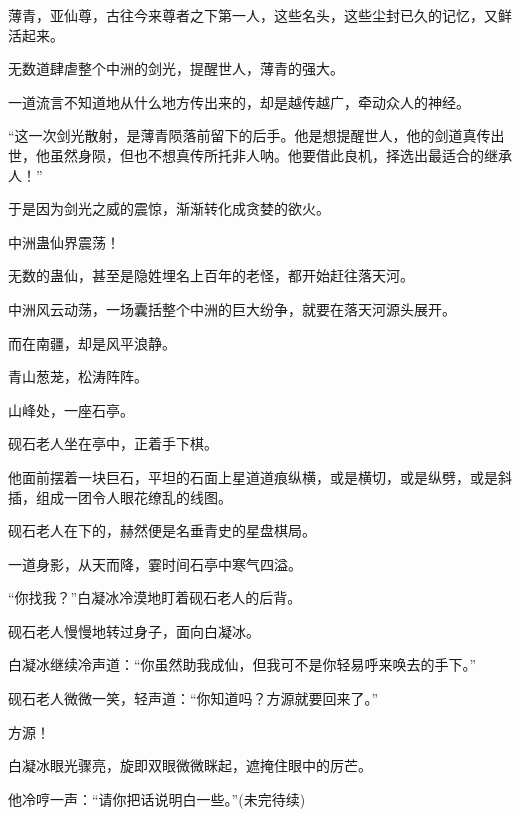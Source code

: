 \begin{this_body}
薄青，亚仙尊，古往今来尊者之下第一人，这些名头，这些尘封已久的记忆，又鲜活起来。

无数道肆虐整个中洲的剑光，提醒世人，薄青的强大。

一道流言不知道地从什么地方传出来的，却是越传越广，牵动众人的神经。

“这一次剑光散射，是薄青陨落前留下的后手。他是想提醒世人，他的剑道真传出世，他虽然身陨，但也不想真传所托非人呐。他要借此良机，择选出最适合的继承人！”

于是因为剑光之威的震惊，渐渐转化成贪婪的欲火。

中洲蛊仙界震荡！

无数的蛊仙，甚至是隐姓埋名上百年的老怪，都开始赶往落天河。

中洲风云动荡，一场囊括整个中洲的巨大纷争，就要在落天河源头展开。

而在南疆，却是风平浪静。

青山葱茏，松涛阵阵。

山峰处，一座石亭。

砚石老人坐在亭中，正着手下棋。

他面前摆着一块巨石，平坦的石面上星道道痕纵横，或是横切，或是纵劈，或是斜插，组成一团令人眼花缭乱的线图。

砚石老人在下的，赫然便是名垂青史的星盘棋局。

一道身影，从天而降，霎时间石亭中寒气四溢。

“你找我？”白凝冰冷漠地盯着砚石老人的后背。

砚石老人慢慢地转过身子，面向白凝冰。

白凝冰继续冷声道：“你虽然助我成仙，但我可不是你轻易呼来唤去的手下。”

砚石老人微微一笑，轻声道：“你知道吗？方源就要回来了。”

方源！

白凝冰眼光骤亮，旋即双眼微微眯起，遮掩住眼中的厉芒。

他冷哼一声：“请你把话说明白一些。”(未完待续)

\end{this_body}

